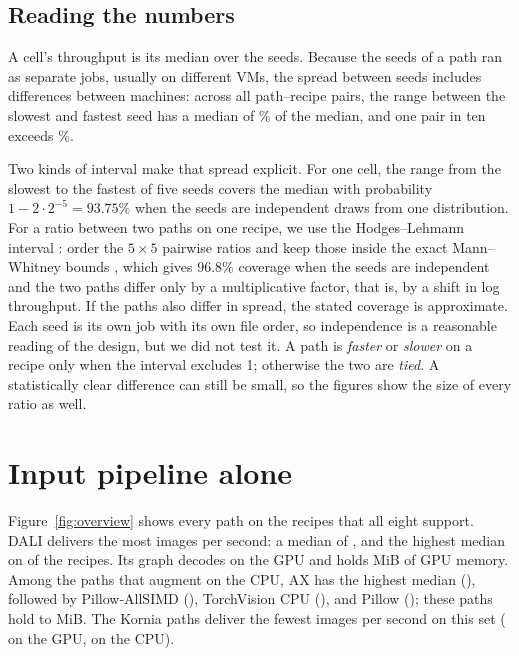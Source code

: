 \documentclass[11pt]{article}
\begin{document}
\subsection{Reading the numbers}
\label{sec:statistics}

A cell's throughput is its median over the \SeedCount{} seeds. Because the seeds of a path ran as
separate jobs, usually on different VMs, the spread between seeds includes differences between
machines: across all
path--recipe pairs, the range between the slowest and fastest seed has a median of
\SeedSpreadMedian\% of the median, and one pair in ten exceeds \SeedSpreadNinety\%.

Two kinds of interval make that spread explicit. For one cell, the range from the slowest to the
fastest of five seeds covers the median with probability \(1-2\cdot2^{-5}=93.75\%\) when the seeds
are independent draws from one distribution. For a ratio between two paths on one recipe, we use the
Hodges--Lehmann interval \cite{hodgeslehmann}: order the \(5\times5\) pairwise ratios and keep those
inside the exact Mann--Whitney bounds \cite{mannwhitney}, which gives \(96.8\%\) coverage when the
seeds are independent and the two paths differ only by a multiplicative factor, that is, by a shift in
log throughput. If the paths also differ in spread, the stated coverage is approximate. Each seed is
its own job with its own file order, so independence is a reasonable reading of the design, but we did
not test it. A path is \emph{faster} or \emph{slower} on a recipe only when the interval excludes 1;
otherwise the two are \emph{tied}. A statistically clear difference can still be small, so the
figures show the size of every ratio as well.

\section{Input pipeline alone}
\label{sec:loader}

Figure~\ref{fig:overview} shows every path on the \CommonRecipeCount{} recipes that all eight
support. DALI delivers the most images per second: a median of \CommonSpeedDALIGPU{}, and the
highest median on \CommonDALIFastest{} of the \CommonRecipeCount{} recipes. Its graph decodes on
the GPU and holds \CommonMemoryDALIGPU{} MiB of GPU memory. Among the
paths that augment on the CPU, AX has the highest median (\CommonSpeedAlbumentationsX{}),
followed by Pillow-AllSIMD (\CommonSpeedAllSIMD{}), TorchVision CPU (\CommonSpeedTorchVisionCPU{}),
and Pillow (\CommonSpeedPillowCPU{}); these paths hold \CommonMemoryAlbumentationsX{} to
\CommonMemoryKorniaCPU{} MiB. The Kornia paths deliver the fewest images per second on this set
(\CommonSpeedKorniaGPU{} on the GPU, \CommonSpeedKorniaCPU{} on the CPU).
\end{document}
